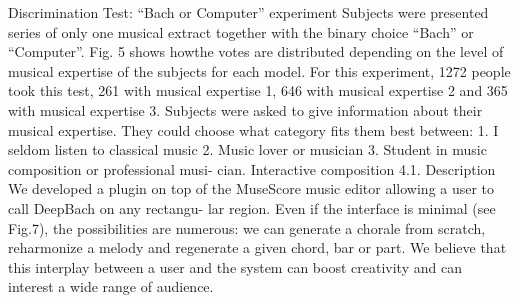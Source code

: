Discrimination Test: “Bach or Computer” experiment
Subjects were presented series of only one musical extract together with the binary choice “Bach” or “Computer”. Fig. 5 shows howthe votes are distributed depending on the level of musical expertise of the subjects for each model. For this experiment, 1272 people took this test, 261 with musical expertise 1, 646 with musical expertise 2 and 365 with musical expertise 3.
Subjects were asked to give information about their musical expertise. They could choose what category fits them best between:
1. I seldom listen to classical music
2. Music lover or musician
3. Student in music composition or professional musi- cian.
Interactive composition 4.1. Description
We developed a plugin on top of the MuseScore music editor allowing a user to call DeepBach on any rectangu- lar region. Even if the interface is minimal (see Fig.7), the possibilities are numerous: we can generate a chorale from scratch, reharmonize a melody and regenerate a given chord, bar or part. We believe that this interplay between a user and the system can boost creativity and can interest a wide range of audience.



